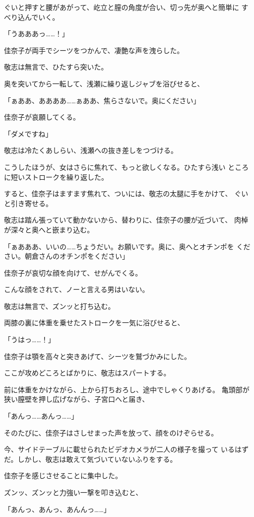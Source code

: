 ﻿\documentclass[
    book,tate,
    line_length=30zw,
    jafontsize=12pt,
    paper=b5j,
    landscape,
    ]{jlreq}
\begin{document}
ぐいと押すと腰があがって、屹立と膣の角度が合い、切っ先が奥へと簡単に
すべり込んでいく。

「うあああっ……！」

佳奈子が両手でシーツをつかんで、凄艶な声を洩らした。

敬志は無言で、ひたすら突いた。

奥を突いてから一転して、浅瀬に繰り返しジャブを浴びせると、

「ぁああ、ああああ……ぁああ、焦らさないで。奥にください」

佳奈子が哀願してくる。

「ダメですね」

敬志は冷たくあしらい、浅瀬への抜き差しをつづける。

こうしたほうが、女はさらに焦れて、もっと欲しくなる。ひたすら浅い
ところに短いストロークを繰り返した。

すると、佳奈子はますます焦れて、ついには、敬志の太腿に手をかけて、
ぐいと引き寄せる。

敬志は踏ん張っていて動かないから、替わりに、佳奈子の腰が近づいて、
肉棹が深々と奥へと嵌まり込む。

「ぁあああ、いいの……ちょうだい。お願いです。奥に、奥へとオチンポを
ください。朝倉さんのオチンポをください」

佳奈子が哀切な顔を向けて、せがんでくる。

こんな顔をされて、ノーと言える男はいない。

敬志は無言で、ズンッと打ち込む。

両膝の裏に体重を乗せたストロークを一気に浴びせると、

「うはっ……！」

佳奈子は顎を高々と突きあげて、シーツを鷲づかみにした。

ここが攻めどころとばかりに、敬志はスパートする。

前に体重をかけながら、上から打ちおろし、途中でしゃくりあげる。
亀頭部が狭い膣壁を押し広げながら、子宮口へと届き、

「あんっ……あんっ……」

そのたびに、佳奈子はさしせまった声を放って、顔をのけぞらせる。

今、サイドテーブルに載せられたビデオカメラが二人の様子を撮って
いるはずだ。しかし、敬志は敢えて気づいていないふりをする。

佳奈子を感じさせることに集中した。

ズンッ、ズンッと力強い一撃を叩き込むと、

「あんっ、あんっ、あんんっ……」
\end{document}
